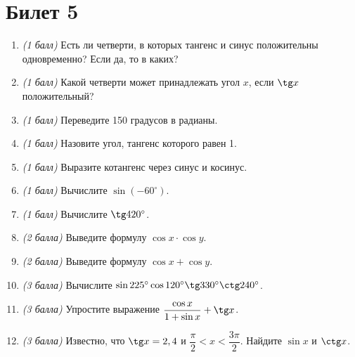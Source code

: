 \documentclass[12pt, a4paper]{article}
\begin{document}
\section*{Билет 5}
\begin{enumerate}
	\item \textit{(1 балл)} Есть ли четверти, в которых тангенс и синус положительны одновременно? Если да, то в каких?
	\item \textit{(1 балл)} Какой четверти может принадлежать угол $x$, если $\tg x$ положительный?
	\item \textit{(1 балл)} Переведите 150 градусов в радианы.
	\item \textit{(1 балл)} Назовите угол, тангенс которого равен 1.
	\item \textit{(1 балл)} Выразите котангенс через синус и косинус.
	\item \textit{(1 балл)} Вычислите $\sin (-60^{\circ})$.
	\item \textit{(1 балл)} Вычислите $\tg 420^{\circ}$.
	\item \textit{(2 балла)} Выведите формулу $\cos x \cdot \cos y$.
	\item \textit{(2 балла)} Выведите формулу $\cos x + \cos y$.
	\item \textit{(3 балла)} Вычислите $\sin 225^{\circ} \cos 120^{\circ} \tg 330^{\circ} \ctg 240^{\circ}$.
	\item \textit{(3 балла)} Упростите выражение $\dfrac{\cos x}{1+\sin x}+ \tg x$.
	\item \textit{(3 балла)} Известно, что $\tg x=2,4$ и $\dfrac{\pi}{2}<x<\dfrac{3\pi}{2}$. Найдите $\sin x$ и $\ctg x$.
\end{enumerate}
\end{document}
